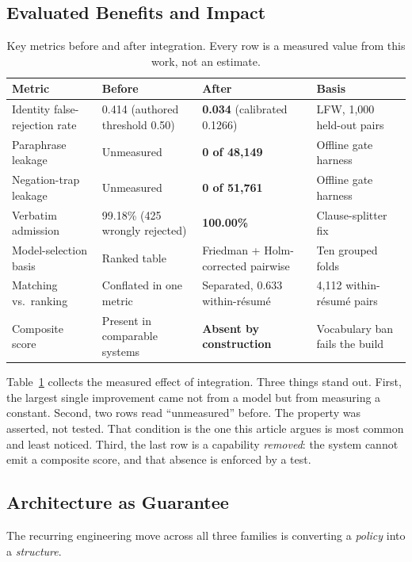 \subsection{Evaluated Benefits and Impact}

\begin{table}[t]
\caption{Key metrics before and after integration. Every row is a measured value
from this work, not an estimate.}
\label{tab:before-after}
\small
\begin{tabular}{@{}p{3.6cm}p{4.4cm}p{4.4cm}p{3.4cm}@{}}
\toprule
Metric & Before & After & Basis \\
\midrule
Identity false-rejection rate & 0.414 (authored threshold 0.50) &
\textbf{0.034} (calibrated 0.1266) & LFW, 1{,}000 held-out pairs \\
Paraphrase leakage & Unmeasured & \textbf{0 of 48{,}149} & Offline gate harness \\
Negation-trap leakage & Unmeasured & \textbf{0 of 51{,}761} & Offline gate harness \\
Verbatim admission & 99.18\% (425 wrongly rejected) & \textbf{100.00\%} &
Clause-splitter fix \\
Model-selection basis & Ranked table & Friedman + Holm-corrected pairwise &
Ten grouped folds \\
Matching vs.\ ranking & Conflated in one metric & Separated, 0.633 within-résumé
& 4{,}112 within-résumé pairs \\
Composite score & Present in comparable systems & \textbf{Absent by construction}
& Vocabulary ban fails the build \\
\bottomrule
\end{tabular}
\end{table}

Table~\ref{tab:before-after} collects the measured effect of integration. Three things stand out. First, the largest single improvement came not from a model
but from measuring a constant. Second, two rows read ``unmeasured'' before. The property was asserted, not tested. That condition is the one this article argues is most common and least noticed. Third, the last row is a capability
\emph{removed}: the system cannot emit a composite score, and that absence is
enforced by a test.

\subsection{Architecture as Guarantee}

The recurring engineering move across all three families is converting a
\emph{policy} into a \emph{structure}.

